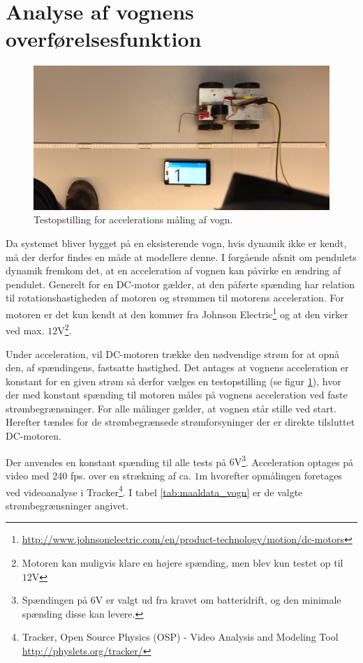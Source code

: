 \section{Analyse af vognens overførelsesfunktion}\label{sec:sec_motoroverforelse}
\begin{figure}
	\centering
	\includegraphics[width=.48\textwidth]{billeder/testopstilling_vogn.png}
	\caption{Testopstilling for accelerations måling af vogn.}
	\label{fig:testopstilling_vogn}
\end{figure}
\FloatBlock

Da systemet bliver bygget på en eksisterende vogn, hvis dynamik ikke er kendt, må der derfor findes en måde at modellere denne.
I forgående afsnit om pendulets dynamik fremkom det, at en acceleration af vognen kan påvirke en ændring af pendulet.
Generelt for en DC-motor gælder, at den påførte spænding har relation til rotationshastigheden af motoren og strømmen til motorens acceleration.    
For motoren er det kun kendt at den kommer fra Johnson Electric\footnote{\url{http://www.johnsonelectric.com/en/product-technology/motion/dc-motors}} og at den virker ved max. $12 \si{\volt}$\footnote{Motoren kan muligvis klare en højere spænding, men blev kun testet op til $12\si{\volt}$}. 

Under acceleration, vil DC-motoren trække den nødvendige strøm for at opnå den, af spændingens, fastsatte hastighed. 
Det antages at vognens acceleration er konstant for en given strøm så derfor vælges en testopstilling (se figur \ref{fig:testopstilling_vogn}), hvor der med konstant spænding til motoren måles på vognens acceleration ved faste strømbegrænsninger.
For alle målinger gælder, at vognen står stille ved start.
Herefter tændes for de strømbegrænsede strømforsyninger der er direkte tilsluttet DC-motoren. 

Der anvendes en konstant spænding til alle tests på $6 \si{\volt}$\footnote{Spændingen på  $6 \si{\volt}$ er valgt ud fra kravet om batteridrift, og den minimale spænding disse kan levere.}.
Acceleration optages på video med 240 fps. over en strækning af ca. $1 \si{\meter}$ hvorefter opmålingen foretages ved videoanalyse i Tracker\footnote{Tracker, Open Source Physics (OSP) - Video Analysis and Modeling Tool \url{http://physlets.org/tracker/}}.
I tabel \ref{tab:maaldata_vogn} er de valgte strømbegrænsninger angivet.

